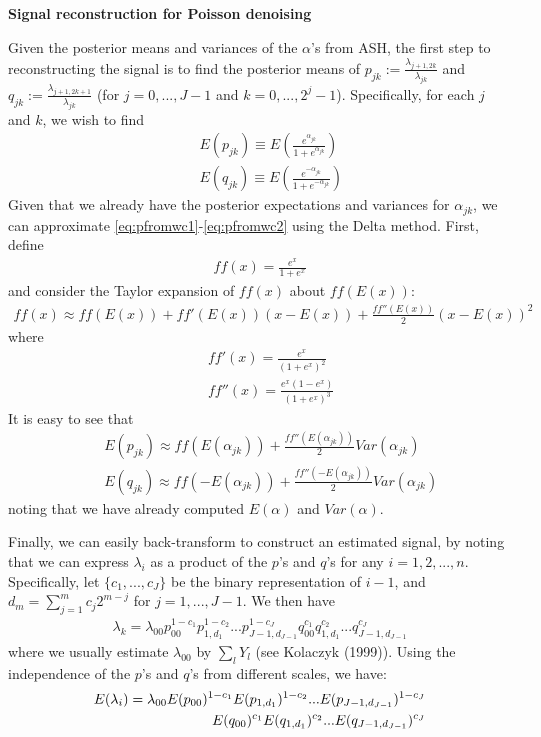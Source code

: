 \documentclass[12pt]{article}
\newcommand{\Ga}{\alpha}
\newcommand{\Gl}{\lambda}    \newcommand{\GL}{\Lambda}
\begin{document}
\begin{appendices}
\section{}\label{app:reconstruction}\bigskip
\textbf{Signal reconstruction for Poisson denoising}

Given the posterior means and variances of the $\Ga$'s from ASH, the first step to reconstructing the signal is to find the posterior means of $p_{jk}:=\frac{\Gl_{j+1,2k}}{\Gl_{jk}}$ and $q_{jk}:=\frac{\Gl_{j+1,2k+1}}{\Gl_{jk}}$ (for $j=0,...,J-1$ and $k=0,...,2^j-1$). Specifically, for each $j$ and $k$, we wish to find
\begin{eqnarray}\label{eq:pfromwc1}
&&E(p_{jk})\equiv E\left(\frac{e^{\Ga_{jk}}}{1+e^{\Ga_{jk}}}\right)\\
\label{eq:pfromwc2}&&E(q_{jk})\equiv E\left(\frac{e^{-\Ga_{jk}}}{1+e^{-\Ga_{jk}}}\right)\end{eqnarray}
Given that we already have the posterior expectations and variances for $\Ga_{jk}$, we can approximate \eqref{eq:pfromwc1}-\eqref{eq:pfromwc2} using the Delta method. First, define
\begin{eqnarray}\label{eq:ff}ff(x)=\frac{e^x}{1+e^x}\end{eqnarray}
and consider the Taylor expansion of $ff(x)$ about $ff(E(x))$:
\begin{eqnarray}\label{eq:delta}ff(x)\approx ff(E(x))+ff'(E(x))(x-E(x))+\frac{ff''(E(x))}{2}(x-E(x))^2\end{eqnarray}
where
\begin{eqnarray}
\label{eq:fderiv}&&ff'(x)=\frac{e^x}{(1+e^x)^2}\\
\label{eq:sderiv}&&ff''(x)=\frac{e^x(1-e^{x})}{(1+e^x)^3}
\end{eqnarray}
It is easy to see that
\begin{eqnarray}
&&E(p_{jk})\approx ff(E(\Ga_{jk}))+\frac{ff''(E(\Ga_{jk}))}{2}Var(\Ga_{jk})\\
\label{eq:Ep}&&E(q_{jk})\approx ff(-E(\Ga_{jk}))+\frac{ff''(-E(\Ga_{jk}))}{2}Var(\Ga_{jk})
\end{eqnarray}
noting that we have already computed $E(\Ga)$ and $Var(\Ga)$.

Finally, we can easily back-transform to construct an estimated signal, by noting that we can express $\Gl_i$ as a product of the $p$'s and $q$'s for any $i=1,2,...,n$. Specifically, let $\{c_1,...,c_J\}$ be the binary representation of $i-1$, and $d_m=\sum_{j=1}^m c_j2^{m-j}$ for $j=1,...,J-1$. We then have
\begin{eqnarray}\label{eq:product}\Gl_k=\Gl_{00}p_{00}^{1-c_1}p_{1,d_1}^{1-c_2}...p_{J-1,d_{J-1}}^{1-c_J}q_{00}^{c_1}q_{1,d_1}^{c_2}...q_{J-1,d_{J-1}}^{c_J}\end{eqnarray}
where we usually estimate $\Gl_{00}$ by $\sum_l Y_l$ (see Kolaczyk (1999)). Using the independence of the $p$'s and $q$'s from different scales, we have:
\begin{eqnarray}\label{eq:Eproduct}E(\Gl_i)=\Gl_{00}E(p_{00})^{1-c_1}E(p_{1,d_1})^{1-c_2}...E(p_{J-1,d_{J-1}})^{1-c_J}\notag\\
E(q_{00})^{c_1}E(q_{1,d_1})^{c_2}...E(q_{J-1,d_{J-1}})^{c_J}\end{eqnarray}


\end{appendices}
\end{document}
